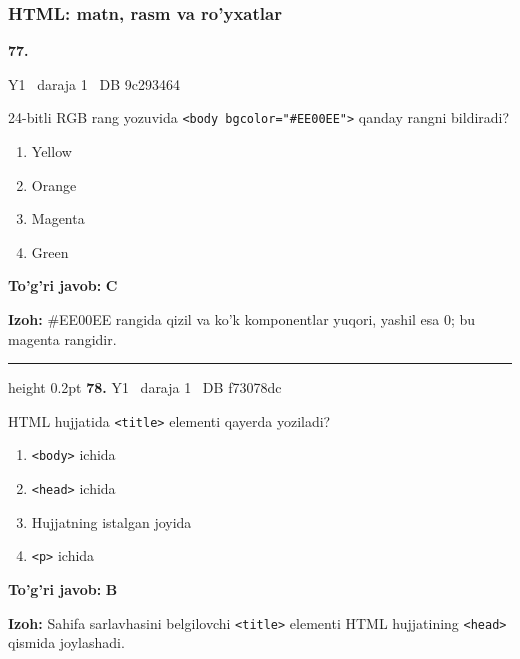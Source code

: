 \documentclass[10pt,a4paper,oneside]{article}
\begin{document}
\subsubsection{HTML: matn, rasm va ro'yxatlar}
\hypertarget{q77}{\textbf{\color{ink}77.}}  {\color{muted}\scriptsize Y1 \textbullet\ daraja 1 \textbullet\ DB 9c293464}
\par
24-bitli RGB rang yozuvida \texttt{\textless{}body bgcolor="\#EE00EE"\textgreater{}} qanday rangni bildiradi?
\begin{enumerate}[label=\Alph*),leftmargin=9mm]
\item Yellow
\item Orange
\item Magenta
\item Green
\end{enumerate}
\begin{tcolorbox}[enhanced,breakable,colback=teal!4,colframe=teal!45!black,boxrule=0.45pt,arc=1.2mm,left=2.8mm,right=2.8mm,top=2mm,bottom=2mm,before skip=2mm,after skip=2mm]
\textbf{\color{teal}To'g'ri javob:} \textbf{C}
\par\smallskip
\textbf{Izoh:} \#EE00EE rangida qizil va ko'k komponentlar yuqori, yashil esa 0; bu magenta rangidir.
\end{tcolorbox}
\vspace{2mm}\hrule height 0.2pt \vspace{4mm}
\hypertarget{q78}{\textbf{\color{ink}78.}}  {\color{muted}\scriptsize Y1 \textbullet\ daraja 1 \textbullet\ DB f73078dc}
\par
HTML hujjatida \texttt{\textless{}title\textgreater{}} elementi qayerda yoziladi?
\begin{enumerate}[label=\Alph*),leftmargin=9mm]
\item \texttt{\textless{}body\textgreater{}} ichida
\item \texttt{\textless{}head\textgreater{}} ichida
\item Hujjatning istalgan joyida
\item \texttt{\textless{}p\textgreater{}} ichida
\end{enumerate}
\begin{tcolorbox}[enhanced,breakable,colback=teal!4,colframe=teal!45!black,boxrule=0.45pt,arc=1.2mm,left=2.8mm,right=2.8mm,top=2mm,bottom=2mm,before skip=2mm,after skip=2mm]
\textbf{\color{teal}To'g'ri javob:} \textbf{B}
\par\smallskip
\textbf{Izoh:} Sahifa sarlavhasini belgilovchi \texttt{\textless{}title\textgreater{}} elementi HTML hujjatining \texttt{\textless{}head\textgreater{}} qismida joylashadi.
\end{tcolorbox}
\end{document}
